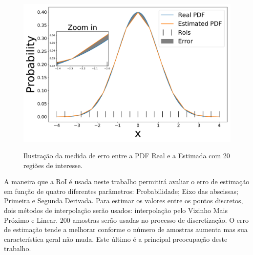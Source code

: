 \begin{figure}[!ht]
	\centering
	\includegraphics[width=0.6\linewidth]{./figuras/error1}\\
	\caption{Ilustração da medida de erro entre a PDF Real e a Estimada com 20 regiões de interesse.}
	\label{fig:error}
\end{figure}


A maneira que a \ac{RoI} é usada neste trabalho permitirá avaliar o erro de estimação em função de quatro diferentes parâmetros: Probabilidade; Eixo das abscissas; Primeira e Segunda Derivada. Para estimar os valores entre os pontos discretos, dois métodos de interpolação serão usados: interpolação pelo Vizinho Mais Próximo e Linear. 200 amostras serão usadas no processo de discretização. O erro de estimação tende a melhorar conforme o número de amostras aumenta mas sua característica geral não muda. Este último é a principal preocupação deste trabalho. 
